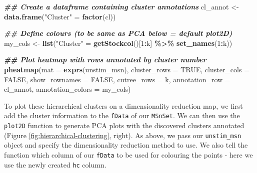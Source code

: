 \documentclass[9pt,a4paper,]{extarticle}
\newenvironment{Shaded}{\begin{snugshade}}{\end{snugshade}}
\newcommand{\AttributeTok}[1]{\textcolor[rgb]{0.13,0.29,0.53}{#1}}
\newcommand{\ConstantTok}[1]{\textcolor[rgb]{0.56,0.35,0.01}{#1}}
\newcommand{\DecValTok}[1]{\textcolor[rgb]{0.00,0.00,0.81}{#1}}
\newcommand{\DocumentationTok}[1]{\textcolor[rgb]{0.56,0.35,0.01}{\textbf{\textit{#1}}}}
\newcommand{\FloatTok}[1]{\textcolor[rgb]{0.00,0.00,0.81}{#1}}
\newcommand{\FunctionTok}[1]{\textcolor[rgb]{0.13,0.29,0.53}{\textbf{#1}}}
\newcommand{\NormalTok}[1]{#1}
\newcommand{\OtherTok}[1]{\textcolor[rgb]{0.56,0.35,0.01}{#1}}
\newcommand{\SpecialCharTok}[1]{\textcolor[rgb]{0.81,0.36,0.00}{\textbf{#1}}}
\newcommand{\StringTok}[1]{\textcolor[rgb]{0.31,0.60,0.02}{#1}}
\begin{document}
\begin{Shaded}
\begin{Highlighting}[]
\DocumentationTok{\#\# Create a dataframe containing cluster annotations}
\NormalTok{cl\_annot }\OtherTok{\textless{}{-}} \FunctionTok{data.frame}\NormalTok{(}\StringTok{"Cluster"} \OtherTok{=} \FunctionTok{factor}\NormalTok{(cl))}

\DocumentationTok{\#\# Define colours (to be same as PCA below = default plot2D)}
\NormalTok{my\_cols }\OtherTok{\textless{}{-}} \FunctionTok{list}\NormalTok{(}\StringTok{"Cluster"} \OtherTok{=} \FunctionTok{getStockcol}\NormalTok{()[}\DecValTok{1}\SpecialCharTok{:}\NormalTok{k] }\SpecialCharTok{\%\textgreater{}\%} \FunctionTok{set\_names}\NormalTok{(}\DecValTok{1}\SpecialCharTok{:}\NormalTok{k))}

\DocumentationTok{\#\# Plot heatmap with rows annotated by cluster number}
\FunctionTok{pheatmap}\NormalTok{(}\AttributeTok{mat =} \FunctionTok{exprs}\NormalTok{(unstim\_msn), }
         \AttributeTok{cluster\_rows =} \ConstantTok{TRUE}\NormalTok{,}
         \AttributeTok{cluster\_cols =} \ConstantTok{FALSE}\NormalTok{,}
         \AttributeTok{show\_rownames =} \ConstantTok{FALSE}\NormalTok{,}
         \AttributeTok{cutree\_rows =}\NormalTok{ k, }
         \AttributeTok{annotation\_row =}\NormalTok{ cl\_annot,}
         \AttributeTok{annotation\_colors =}\NormalTok{ my\_cols)}
\end{Highlighting}
\end{Shaded}

To plot these hierarchical clusters on a dimensionality reduction map, we first
add the cluster information to the \texttt{fData} of our \texttt{MSnSet}. We can then use the
\texttt{plot2D} function to generate PCA plots with the discovered clusters annotated (Figure \ref{fig:hierarchical-clustering}, right).
As above, we pass our \texttt{unstim\_msn} object and specify the dimensionality reduction
method to use. We also tell the function which column of our \texttt{fData} to be used
for colouring the points - here we use the newly created \texttt{hc} column.

\begin{Shaded}
\end{Shaded}
\end{document}
